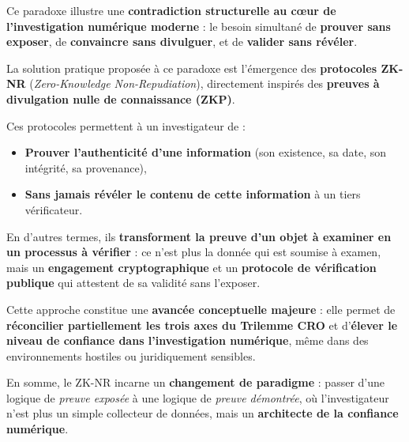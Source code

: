 \documentclass[11pt]{article}
\begin{document}
\vspace{0.5cm}

\noindent Ce paradoxe illustre une \textbf{contradiction structurelle au cœur de l’investigation numérique moderne} : 
le besoin simultané de \textbf{prouver sans exposer}, de \textbf{convaincre sans divulguer}, 
et de \textbf{valider sans révéler}.

\vspace{0.5cm}

La solution pratique proposée à ce paradoxe est l’émergence des \textbf{protocoles ZK-NR} 
(\textit{Zero-Knowledge Non-Repudiation}), 
directement inspirés des \textbf{preuves à divulgation nulle de connaissance (ZKP)}.

\vspace{0.3cm}

\noindent Ces protocoles permettent à un investigateur de :
\begin{itemize}
    \item \textbf{Prouver l’authenticité d’une information} (son existence, sa date, son intégrité, sa provenance),
    \item \textbf{Sans jamais révéler le contenu de cette information} à un tiers vérificateur.
\end{itemize}

\vspace{0.3cm}

\noindent En d’autres termes, ils \textbf{transforment la preuve d’un objet à examiner en un processus à vérifier} :
ce n’est plus la donnée qui est soumise à examen, 
mais un \textbf{engagement cryptographique} et un \textbf{protocole de vérification publique} 
qui attestent de sa validité sans l’exposer.

\vspace{0.3cm}

\noindent Cette approche constitue une \textbf{avancée conceptuelle majeure} : 
elle permet de \textbf{réconcilier partiellement les trois axes du Trilemme CRO} 
et d’\textbf{élever le niveau de confiance dans l’investigation numérique}, 
même dans des environnements hostiles ou juridiquement sensibles.

\vspace{0.5cm}

\noindent En somme, le ZK-NR incarne un \textbf{changement de paradigme} : 
passer d’une logique de \textit{preuve exposée} à une logique de \textit{preuve démontrée}, 
où l’investigateur n’est plus un simple collecteur de données, 
mais un \textbf{architecte de la confiance numérique}.
\end{document}
